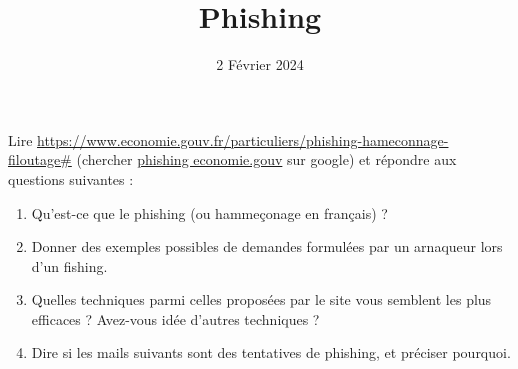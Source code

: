 \documentclass{article}
\title{Phishing}
\author{}
\date{2 Février 2024}
\begin{document}
\maketitle

Lire \url{https://www.economie.gouv.fr/particuliers/phishing-hameconnage-filoutage#} (chercher \url{phishing economie.gouv} sur google) et répondre aux questions suivantes :
\begin{enumerate}
\item Qu'est-ce que le phishing (ou hammeçonage en français) ?
\item Donner des exemples possibles de demandes formulées par un arnaqueur lors d'un fishing.
\item Quelles techniques parmi celles proposées par le site vous semblent les plus efficaces ? Avez-vous idée d'autres techniques ?
\item Dire si les mails suivants sont des tentatives de phishing, et préciser pourquoi.
\end{enumerate}
\end{document}
